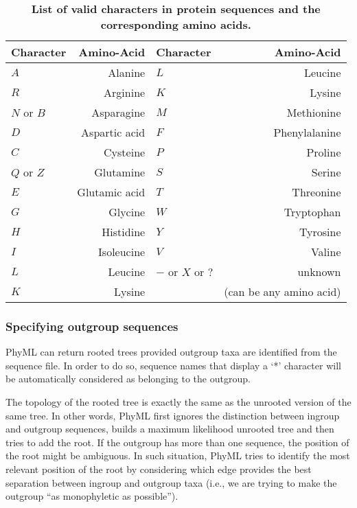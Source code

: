 \documentclass[a4paper,12pt]{article}
\begin{document}
\begin{table}
\begin{center}
\begin{tabular}{lr|lr}
\hline
Character & Amino-Acid & Character & Amino-Acid \\
\hline
$A$       & Alanine &         $L$       & Leucine \\             
$R$       & Arginine &        $K$       & Lysine \\              
$N$ or $B$& Asparagine &      $M$       & Methionine \\          
$D$       & Aspartic acid &   $F$       & Phenylalanine \\       
$C$       & Cysteine &        $P$       & Proline \\             
$Q$ or $Z$& Glutamine &       $S$       & Serine \\              
$E$       & Glutamic acid &   $T$       & Threonine \\           
$G$       & Glycine &         $W$       & Tryptophan \\          
$H$       & Histidine &       $Y$       & Tyrosine \\            
$I$       & Isoleucine &      $V$       & Valine \\              
$L$       & Leucine &         $-$ or $X$ or $?$ & unknown \\     
$K$       & Lysine &          & (can be any amino acid) \\       
\hline
\end{tabular}
\end{center}
\caption{{\bf List of valid characters in protein sequences and the corresponding amino acids.}}\label{tab:ambigu_aa}
\end{table}

\subsubsection{Specifying outgroup sequences}

PhyML can return rooted trees provided outgroup taxa are identified from the sequence file. In
order to do so, sequence names that display a `*' character will be automatically considered as
belonging to the outgroup. 

The topology of  the rooted tree is  exactly the same as the  unrooted version of the  same tree. In
other words,  PhyML first ignores the distinction  between ingroup and outgroup  sequences, builds a
maximum likelihood unrooted tree  and then tries to add the root. If the  outgroup has more than one
sequence, the position  of the root might be  ambiguous. In such situation, PhyML  tries to identify
the  most relevant  position of  the root  by considering  which edge  provides the  best separation
between ingroup  and outgroup taxa (i.e.,  we are trying to  make the outgroup  ``as monophyletic as
possible'').
\end{document}
